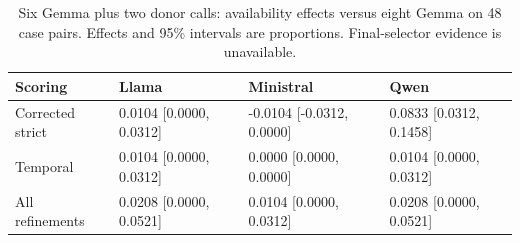 \begin{table}[ht]\centering\small\caption{Six Gemma plus two donor calls: availability effects versus eight Gemma on 48 case pairs. Effects and 95\% intervals are proportions. Final-selector evidence is unavailable.}\begin{tabular}{llll}\toprule
Scoring & Llama & Ministral & Qwen \\ \midrule
Corrected strict & 0.0104 [0.0000, 0.0312] & -0.0104 [-0.0312, 0.0000] & 0.0833 [0.0312, 0.1458] \\
Temporal & 0.0104 [0.0000, 0.0312] & 0.0000 [0.0000, 0.0000] & 0.0104 [0.0000, 0.0312] \\
All refinements & 0.0208 [0.0000, 0.0521] & 0.0104 [0.0000, 0.0312] & 0.0208 [0.0000, 0.0521] \\
\bottomrule\end{tabular}\end{table}
